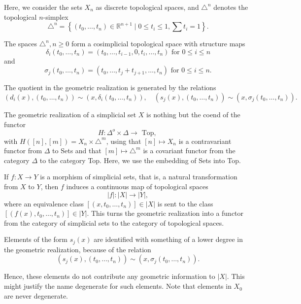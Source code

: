 Here, we consider the sets $X_n$ as discrete topological spaces, and $\triangle^n$ denotes the topological $n$-simplex
$$
\triangle^n=\left\{\left(t_0, \ldots, t_n\right) \in \mathbb{R}^{n+1} \mid 0 \leq t_i \leq 1, \sum t_i=1\right\} .
$$

The spaces $\triangle^n, n \geq 0$ form a cosimplicial topological space with structure maps
$$
\delta_i\left(t_0, \ldots, t_n\right)=\left(t_0, \ldots, t_{i-1}, 0, t_i, \ldots, t_n\right) \text { for } 0 \leq i \leq n
$$
and
$$
\sigma_j\left(t_0, \ldots, t_n\right)=\left(t_0, \ldots, t_j+t_{j+1}, \ldots, t_n\right) \text { for } 0 \leq i \leq n .
$$

The quotient in the geometric realization is generated by the relations
$$
\left(d_i(x),\left(t_0, \ldots, t_n\right)\right) \sim\left(x, \delta_i\left(t_0, \ldots, t_n\right)\right), \quad\left(s_j(x),\left(t_0, \ldots, t_n\right)\right) \sim\left(x, \sigma_j\left(t_0, \ldots, t_n\right)\right) .
$$

\begin{rema}
    The geometric realization of a simplicial set $X$ is nothing but the coend of the functor
    $$
    H: \Delta^o \times \Delta \rightarrow \text { Top, }
    $$
    with $H([n],[m])=X_n \times \triangle^m$, using that $[n] \mapsto X_n$ is a contravariant functor from $\Delta$ to Sets and that $[m] \mapsto \triangle^m$ is a covariant functor from the category $\Delta$ to the category Top. Here, we use the embedding of Sets into Top.
\end{rema}

If $f: X \rightarrow Y$ is a morphism of simplicial sets, that is, a natural transformation from $X$ to $Y$, then $f$ induces a continuous map of topological spaces
$$
|f|:|X| \rightarrow|Y|,
$$
where an equivalence class $\left[\left(x, t_0, \ldots, t_n\right)\right] \in|X|$ is sent to the class $\left[\left(f(x), t_0, \ldots, t_n\right)\right] \in|Y|$. This turns the geometric realization into a functor from the category of simplicial sets to the category of topological spaces.

Elements of the form $s_j(x)$ are identified with something of a lower degree in the geometric realization, because of the relation
$$
\left(s_j(x),\left(t_0, \ldots, t_n\right)\right) \sim\left(x, \sigma_j\left(t_0, \ldots, t_n\right)\right) .
$$

Hence, these elements do not contribute any geometric information to $|X|$. This might justify the name degenerate for such elements. Note that elements in $X_0$ are never degenerate.

